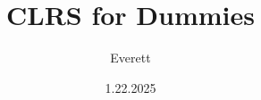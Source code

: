 \documentclass[a4paper,14pt,twoside]{extbook}
\title{CLRS for Dummies}
\author{Everett}
\date{1.22.2025}
\begin{document}
\onehalfspacing
\maketitle
\tableofcontents
\frontmatter%


\mainmatter%






\backmatter%


\printindex
\end{document}
